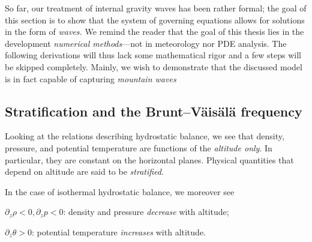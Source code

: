 \documentclass[../main.tex]{subfiles}
\begin{document}
So far, our treatment of internal gravity waves has been rather formal; the goal of this section is to show that the system of governing equations  allows for solutions in the form of \emph{waves.} 
We remind the reader that the goal of this thesis lies in the development \emph{numerical methods}---not in meteorology nor PDE analysis. The following derivations will thus lack some mathematical rigor and a few steps will be skipped completely. Mainly, we wish to demonstrate that the discussed model is in fact capable of capturing \emph{mountain waves}

\subsection{Stratification and the Brunt–Väisälä frequency}
\label{sec:STRAT}

Looking at the relations describing hydrostatic balance, we see that density, pressure, and potential temperature are functions of the \emph{altitude only}. In particular, they are constant on the horizontal planes. Physical quantities that depend on altitude are said to be \emph{stratified}.

In the case of isothermal hydrostatic balance, we moreover see

\begin{compactitem}
\item $\partial_z \rho < 0, \partial_{z} p < 0$: density and pressure \emph{decrease} with altitude;
\item $\partial_z \theta > 0$: potential temperature \emph{increases} with altitude.
\end{compactitem}
\end{document}
